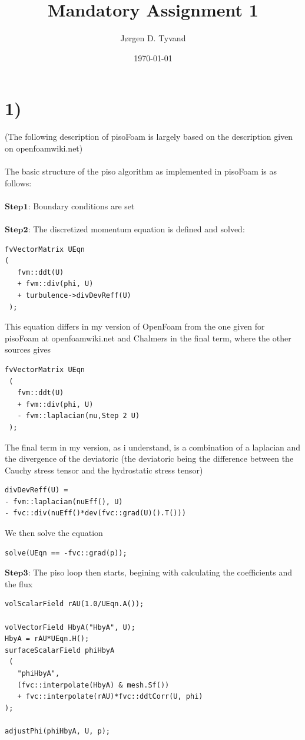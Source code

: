 \documentclass[a4paper,english,11pt,twoside]{article}
\date{\today}
\title{Mandatory Assignment 1}
\author{Jørgen D. Tyvand}
\begin{document}
\maketitle
\newpage

\section*{1)}
(The following description of pisoFoam is largely based on the description given on openfoamwiki.net)\\
\\
The basic structure of the piso algorithm as implemented in pisoFoam is as follows:\\
\\
$\mathbf{Step 1}$: Boundary conditions are set\\
\\
$\mathbf{Step 2}$: The discretized momentum equation is defined and solved:\\
\begin{lstlisting}[style=python]
fvVectorMatrix UEqn
(
   fvm::ddt(U)
   + fvm::div(phi, U)
   + turbulence->divDevReff(U)
 );
\end{lstlisting}
This equation differs in my version of OpenFoam from the one given for pisoFoam at openfoamwiki.net and Chalmers in the final term, where the other sources gives\\
\begin{lstlisting}[style=python]
 fvVectorMatrix UEqn
 (
   fvm::ddt(U)
   + fvm::div(phi, U)
   - fvm::laplacian(nu,Step 2 U)
 );
\end{lstlisting}
The final term in my version, as i understand, is a combination of a laplacian and the divergence of the deviatoric  (the deviatoric being the difference between the Cauchy stress tensor and the hydrostatic stress tensor)
\begin{lstlisting}[style=python]
divDevReff(U) =
- fvm::laplacian(nuEff(), U)
- fvc::div(nuEff()*dev(fvc::grad(U)().T())) 
\end{lstlisting}
We then solve the equation
\begin{lstlisting}[style=python]
solve(UEqn == -fvc::grad(p));
\end{lstlisting}
\newpage
$\mathbf{Step 3}$: The piso loop then starts, begining with calculating the coefficients and the flux
\begin{lstlisting}[style=python]
 volScalarField rAU(1.0/UEqn.A());

volVectorField HbyA("HbyA", U);
HbyA = rAU*UEqn.H();
surfaceScalarField phiHbyA
 (
   "phiHbyA",
   (fvc::interpolate(HbyA) & mesh.Sf())
   + fvc::interpolate(rAU)*fvc::ddtCorr(U, phi)
);

adjustPhi(phiHbyA, U, p);
\end{lstlisting}
\end{document}
